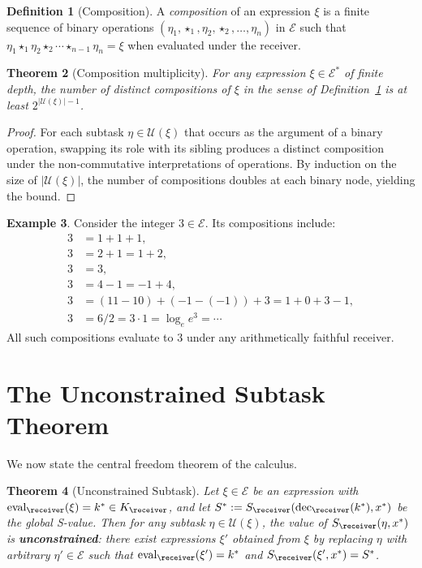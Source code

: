 \documentclass[11pt,a4paper]{article}
\theoremstyle{thmstyle}
\newtheorem{theorem}{Theorem}[section]
\theoremstyle{thmstyle}
\theoremstyle{definition}
\newtheorem{definition}[theorem]{Definition}
\newtheorem{example}[theorem]{Example}
\theoremstyle{remark}
\DeclareMathOperator{\eval}{eval}
\DeclareMathOperator{\dec}{dec}
\newcommand{\Expr}{\mathcal{E}}
\newcommand{\Sub}{\mathcal{U}}
\newcommand{\Sscalar}{S}
\begin{document}
\begin{definition}[Composition]\label{def:composition}
A \emph{composition} of an expression $\xi$ is a finite
sequence of binary operations
$(\eta_{1}, \star_{1}, \eta_{2}, \star_{2}, \ldots,
 \eta_{n})$ in $\Expr$ such that
$\eta_{1} \star_{1} \eta_{2} \star_{2} \cdots \star_{n-1}
\eta_{n} = \xi$ when evaluated under the receiver.
\end{definition}

\begin{theorem}[Composition multiplicity]\label{thm:comp-mult}
For any expression $\xi \in \Expr^{*}$ of finite depth,
the number of distinct compositions of $\xi$ in the
sense of Definition~\ref{def:composition} is at least
$2^{|\Sub(\xi)|-1}$.
\end{theorem}

\begin{proof}
For each subtask $\eta \in \Sub(\xi)$ that occurs as the
argument of a binary operation, swapping its role with
its sibling produces a distinct composition under the
non-commutative interpretations of operations.  By
induction on the size of $|\Sub(\xi)|$, the number of
compositions doubles at each binary node, yielding the
bound.
\end{proof}

\begin{example}\label{ex:integer-3}
Consider the integer $3 \in \Expr$.  Its compositions
include:
\begin{align*}
3 &= 1 + 1 + 1, \\
3 &= 2 + 1 = 1 + 2, \\
3 &= 3, \\
3 &= 4 - 1 = -1 + 4, \\
3 &= (11 - 10) + (-1 - (-1)) + 3 = 1 + 0 + 3 - 1, \\
3 &= 6/2 = 3 \cdot 1 = \log_{e} e^{3} = \cdots
\end{align*}
All such compositions evaluate to $3$ under any
arithmetically faithful receiver.
\end{example}

\section{The Unconstrained Subtask Theorem}
\label{sec:unconstrained-subtask}

We now state the central freedom theorem of the
calculus.

\begin{theorem}[Unconstrained Subtask]\label{thm:unconstrained-subtask}
Let $\xi \in \Expr$ be an expression with
$\eval_{\receiver}(\xi) = k^{*} \in K_{\receiver}$,
and let
$\Sscalar^{*} := \Sscalar_{\receiver}(
\dec_{\receiver}(k^{*}), x^{*})$ be the global
S-value.  Then for any subtask $\eta \in \Sub(\xi)$,
the value of $\Sscalar_{\receiver}(\eta, x^{*})$ is
\textbf{unconstrained}: there exist expressions
$\xi'$ obtained from $\xi$ by replacing $\eta$ with
arbitrary $\eta' \in \Expr$ such that
$\eval_{\receiver}(\xi') = k^{*}$ and
$\Sscalar_{\receiver}(\xi', x^{*}) = \Sscalar^{*}$.
\end{theorem}
\end{document}
